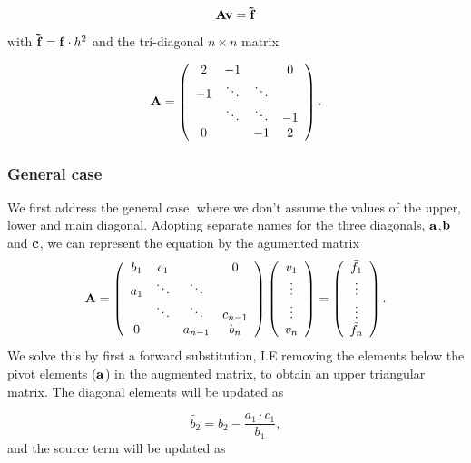 \documentclass{emulateapj}
\begin{document}
\begin{equation}
    \bold{A}\bold{v} = \bold{\tilde{f}}
\end{equation}
with $\bold{\tilde{f}} = \bold{f}\cdot h^2$ and the tri-diagonal $n \times n$ matrix

\begin{equation} \label{eq:specialmatrix}
    \bold{A} = \left( \begin{array}{cccc}
2 & -1 & & 0\\
-1 & \ddots & \ddots & \\
& \ddots & \ddots & -1 \\
0 & & -1 & 2 \end{array} \right) .
\end{equation}

\subsubsection{General case}
We first address the general case, where we don't assume the values of the upper, lower and main diagonal. Adopting separate names for the three diagonals, $\bold{a}$,$\bold{b}$ and $\bold{c}$, we can represent the equation by the agumented matrix  
\begin{equation} \label{eq:generalmatrix}
    \bold{A} = \left( \begin{array}{cccc}
b_{1} & c_1 & & 0 \\
a_1 & \ddots & \ddots & \\
& \ddots & \ddots & c_{n-1} \\
0 & & a_{n-1} & b_{n} \end{array} \right)
\left( \begin{array}{c}
v_1 \\
\vdots \\
\vdots \\
v_n
\end{array} \right)
= \left( \begin{array}{c}
\tilde{f_1} \\
\vdots \\
\vdots \\
\tilde{f_n}
\end{array} \right)
.
\end{equation}
We solve this by first a forward substitution, I.E removing the elements below the pivot elements ($\bold{a}$) in the augmented matrix, to obtain an upper triangular matrix. The diagonal elements will be updated as 

\begin{equation}
    \tilde{b_2} = b_2 - \frac{a_1 \cdot c_1}{b_1},
\end{equation}
and the source term will be updated as
\end{document}
